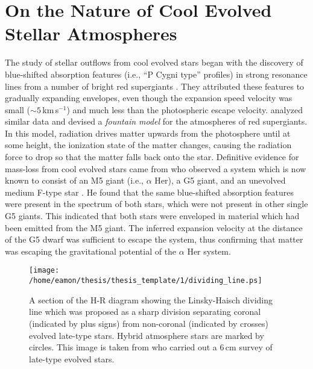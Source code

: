 \section{On the Nature of Cool Evolved Stellar Atmospheres}\label{sec:1.2}
The study of stellar outflows from cool evolved stars began with the discovery of blue-shifted absorption features (i.e., ``P Cygni type'' profiles) in strong resonance lines from a number of bright red supergiants \citep{adams_1935}. They attributed these features to gradually expanding envelopes, even though the expansion speed velocity was small ($\sim 5$\,km\,s$^{-1}$) and much less than the photospheric escape velocity. \cite{spitzer_1939} analyzed similar data and devised a \textit{fountain model} for the atmospheres of red supergiants. In this model, radiation drives matter upwards from the photosphere until at some height, the ionization state of the matter changes, causing the radiation force to drop so that the matter falls back onto the star. Definitive evidence for mass-loss from cool evolved stars came from \cite{deutsch_1956} who observed a system which is now known to consist of an M5 giant (i.e., $\alpha$ Her), a G5 giant, and an unevolved medium F-type star \citep{reimers_1977}. He found that the same blue-shifted absorption features were present in the spectrum of both stars, which were not present in other single G5 giants. This indicated that both stars were enveloped in material which had been emitted from the M5 giant. The inferred expansion velocity at the distance of the G5 dwarf was sufficient to escape the system, thus confirming that matter was escaping the gravitational potential of the $\alpha$ Her system.

\begin{figure}[hbt!]
\centering 
          \texttt{[image: /home/eamon/thesis/thesis\_template/1/dividing\_line.ps]}
\caption[The Linsky-Haisch dividing line]{A section of the H-R diagram showing the Linsky-Haisch dividing line which was proposed as a sharp division separating coronal (indicated by plus signs) from non-coronal (indicated by crosses) evolved late-type stars. Hybrid atmosphere stars are marked by circles. This image is taken from \cite{drake_1986} who carried out a 6\,cm survey of late-type evolved stars.}
\label{fig:1.2.1}
\end{figure}

